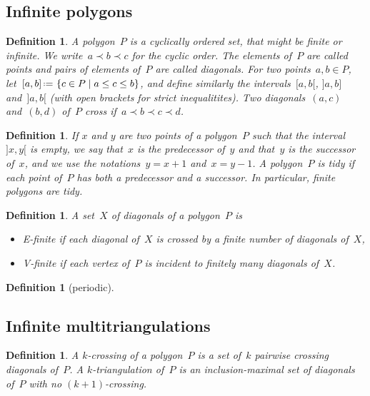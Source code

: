 \documentclass{amsart}
\newtheorem{definition}[theorem]{Definition}
\theoremstyle{remark}
\newcommand{\darkblue}{\color{darkblue}} %
\newcommand{\defn}[1]{\textsl{\darkblue #1}} %
\newcommand{\set}[2]{\left\{ #1 \;\middle|\; #2 \right\}} %
\newcommand{\eqdef}{\mbox{\,\raisebox{0.2ex}{\scriptsize\ensuremath{\mathrm:}}\ensuremath{=}\,}} %
\newcommand*{\ef}[0]{E-finite\xspace}
\newcommand*{\vf}[0]{V-finite\xspace}
\newcommand{\cl}{\prec}
\begin{document}
\subsection{Infinite polygons}

\begin{definition}
A \defn{polygon}~$P$ is a cyclically ordered set, that might be finite or infinite.
We write~$a \cl b \cl c$ for the cyclic order.
The elements of~$P$ are called \defn{points} and pairs of elements of~$P$ are called \defn{diagonals}.
For two points~$a,b \in P$, let~$[a,b] \eqdef \set{c \in P}{a \le c \le b}$, and define similarly the intervals~$[a,b[$, $]a,b]$ and~$]a,b[$ (with open brackets for strict inequalitites).
Two diagonals~$(a,c)$ and~$(b,d)$ of~$P$ \defn{cross} if~$a \cl b \cl c \cl d$.
\end{definition}

\begin{definition}
If $x$ and $y$ are two points of a polygon~$P$ such that the interval~$]x,y[$ is empty, we say that~$x$ is the \defn{predecessor} of~$y$ and that~$y$ is the \defn{successor} of~$x$, and we use the notations~$y = x+1$ and~$x = y-1$. A polygon~$P$ is \defn{tidy} if each point of~$P$ has both a predecessor and a successor. In particular, finite polygons are tidy.
\end{definition}

\begin{definition}
A set~$X$ of diagonals of a polygon~$P$ is 
\begin{itemize}
\item \defn{\ef} if each diagonal of~$X$ is crossed by a finite number of diagonals of~$X$,
\item \defn{\vf} if each vertex of~$P$ is incident to finitely many diagonals of~$X$.
\end{itemize}
\end{definition}

\begin{definition}[periodic]

\end{definition}

\subsection{Infinite multitriangulations}

\begin{definition}
A \defn{$k$-crossing} of a polygon~$P$ is a set of~$k$ pairwise crossing diagonals of~$P$.
A \defn{$k$-triangulation} of~$P$ is an inclusion-maximal set of diagonals of~$P$ with no $(k+1)$-crossing.
\end{definition}
\end{document}
